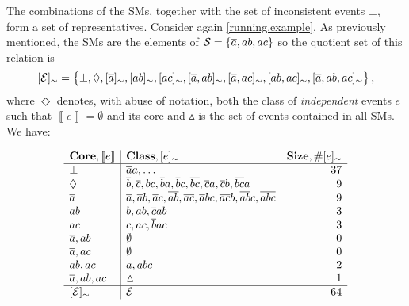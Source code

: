 \documentclass{llncs}
\newcommand{\co}[1]{\ensuremath{\overline{#1}}}
\newcommand{\fml}[1]{\ensuremath{{\cal #1}}}
\newcommand{\stablecore}[1]{\ensuremath{\left\llbracket #1 \right\rrbracket}}
\newcommand{\class}[1]{\ensuremath{[{#1}]_{\sim}}}
\newcommand{\inconsistent}{\bot}
\newcommand{\emptyevent}{\ensuremath{\vartriangle}}
\newcommand{\indepclass}{\ensuremath{\Diamond}}
\renewcommand{\note}[1]{
    \stepcounter{remark}%
    {\!\!\color{red}/}\footnotemark[\arabic{remark}]\!\!%
    \footnotetext[\arabic{remark}]{{\color{red}/}#1}
}
\begin{document}
The combinations of the \aclp{SM}, together with the set of inconsistent events $\inconsistent$, form a set of representatives. Consider again \cref{running.example}. As previously mentioned, the \aclp{SM} are the elements of $\fml{S} = \set{\co{a}, ab, ac}$ so the quotient set of this relation is
\begin{equation}
    \class{\fml{E}} = \set{
        \inconsistent,
        \indepclass,
        \class{\co{a}},
        \class{ab},
        \class{ac},
        \class{\co{a}, ab},
        \class{\co{a}, ac},
        \class{ab, ac},
        \class{\co{a}, ab, ac}
    },
\end{equation}
where $\indepclass$ denotes, with abuse of notation, both the class of \emph{independent} events $e$ such that $\stablecore{e} = \emptyset$ and its core and $\emptyevent$ is the set of events contained in all \acp{SM}. We have:

\begin{equation*}
    \begin{array}{l|lr}
        \text{\textbf{Core}}, \stablecore{e}
         & \text{\textbf{Class}}, \class{e}
         & \text{\textbf{Size}}, \# \class{e}                                                 \\
        \hline
        \inconsistent
         & \co{a}a, \ldots
         & 37
        \\
        \indepclass
         & \co{b}, \co{c}, bc, \co{b}a, \co{b}c, \co{bc}, \co{c}a, \co{c}b, \co{bc}a
         & 9
        \\
        \co{a}
         & \co{a}, \co{a}b, \co{a}c, \co{ab}, \co{ac}, \co{a}bc, \co{ac}b, \co{ab}c, \co{abc}
         & 9
        \\
        ab
         & b, ab, \co{c}ab
         & 3
        \\
        ac
         & c, ac, \co{b}ac
         & 3
        \\
        \co{a}, ab
         & \emptyset
         & 0
        \\
        \co{a}, ac
         & \emptyset
         & 0
        \\
        ab, ac
         & a, abc
         & 2
        \\
        \co{a}, ab, ac
         & \emptyevent
         & 1
        \\
        \hline
        \class{\fml{E}}
         & \fml{E}
         & 64
    \end{array}
\end{equation*}
\end{document}
